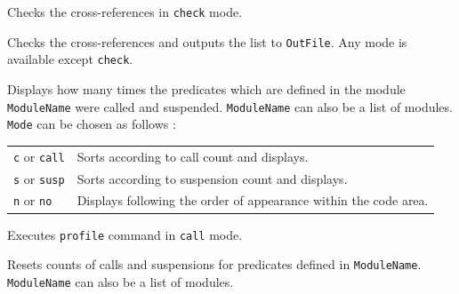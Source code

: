 \begin{itemize}
Checks the cross-references in \verb|check| mode.

Checks the cross-references and outputs the list to \verb|OutFile|.
Any mode is available except \verb|check|.

Displays how many times the predicates which are defined in 
the module \verb|ModuleName| were  called and suspended.
\verb|ModuleName| can also be a list of modules.
\verb|Mode| can be chosen as follows :

\vspace{1ex}
\hspace*{15mm}\begin{tabular}{l@{ $\cdots$ }l}
\verb|c| or \verb|call|   & Sorts according to call count and displays.\\
\verb|s| or \verb|susp|   & Sorts according to suspension count and displays.\\
\verb|n| or \verb|no|
& Displays following the order of appearance within the code area.\\
\end{tabular}
\vspace{1ex}

Executes \verb|profile| command in \verb|call| mode.

Resets counts of calls and suspensions for predicates defined 
in \verb|ModuleName|. \verb|ModuleName| can also be a list of modules.
\end{itemize}
\vspace{1ex}


